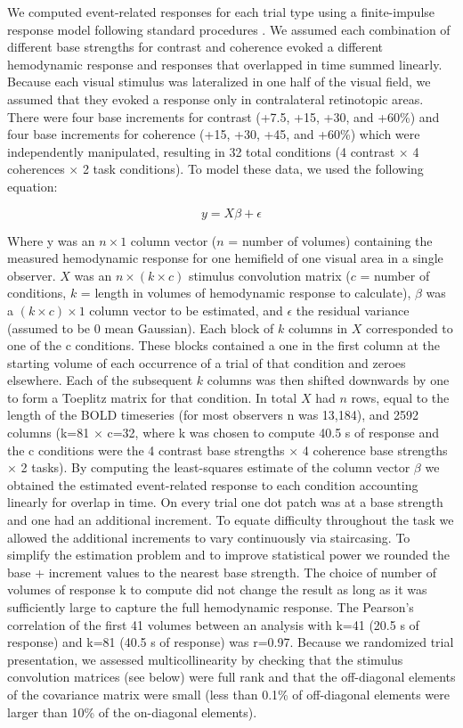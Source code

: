 \documentclass{report}
\begin{document}
We computed event-related responses for each trial type using a finite-impulse response model \citep{Zarahn1997-jc} following standard procedures \citep{Gardner2005-pg}. We assumed each combination of different base strengths for contrast and coherence evoked a different hemodynamic response and responses that overlapped in time summed linearly. Because each visual stimulus was lateralized in one half of the visual field, we assumed that they evoked a response only in contralateral retinotopic areas. There were four base increments for contrast (+7.5, +15, +30, and +60\%) and four base increments for coherence (+15, +30, +45, and +60\%) which were independently manipulated, resulting in 32 total conditions (4 contrast $\times$ 4 coherences $\times$ 2 task conditions). To model these data, we used the following equation:

\begin{equation}
    y=X\beta + \epsilon
\end{equation}

Where y was an $n\times1$ column vector ($n$ = number of volumes) containing the measured hemodynamic response for one hemifield of one visual area in a single observer. $X$ was an $n\times (k\times c)$ stimulus convolution matrix ($c$ = number of conditions, $k$ = length in volumes of hemodynamic response to calculate), $\beta$ was a $(k\times c)\times 1$ column vector to be estimated, and $\epsilon$ the residual variance (assumed to be 0 mean Gaussian). Each block of $k$ columns in $X$ corresponded to one of the c conditions. These blocks contained a one in the first column at the starting volume of each occurrence of a trial of that condition and zeroes elsewhere. Each of the subsequent $k$ columns was then shifted downwards by one to form a Toeplitz matrix for that condition. In total $X$ had $n$ rows, equal to the length of the BOLD timeseries (for most observers n was 13,184), and 2592 columns (k=81 $\times$ c=32, where k was chosen to compute 40.5 s of response and the c conditions were the 4 contrast base strengths $\times$ 4 coherence base strengths $\times$ 2 tasks). By computing the least-squares estimate of the column vector $\beta$ we obtained the estimated event-related response to each condition accounting linearly for overlap in time. On every trial one dot patch was at a base strength and one had an additional increment. To equate difficulty throughout the task we allowed the additional increments to vary continuously via staircasing. To simplify the estimation problem and to improve statistical power we rounded the base + increment values to the nearest base strength. The choice of number of volumes of response k to compute did not change the result as long as it was sufficiently large to capture the full hemodynamic response. The Pearson’s correlation of the first 41 volumes between an analysis with k=41 (20.5 s of response) and k=81 (40.5 s of response) was r=0.97.  Because we randomized trial presentation, we assessed multicollinearity by checking that the stimulus convolution matrices (see below) were full rank and that the off-diagonal elements of the covariance matrix were small (less than 0.1\% of off-diagonal elements were larger than 10\% of the on-diagonal elements).
\end{document}
